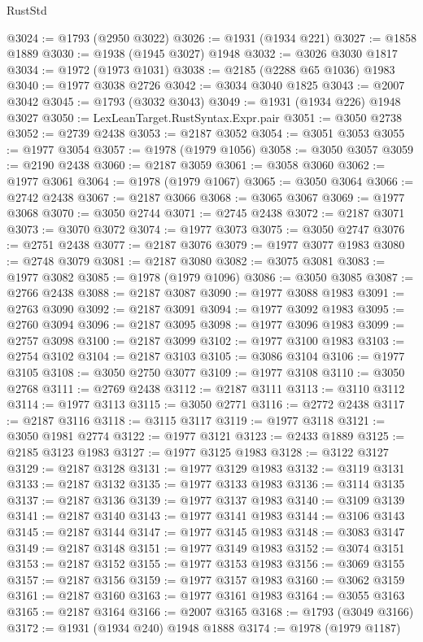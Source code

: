 \begin{lexlean}{RustStd}
\begin{coremodule}
@3024 := @1793 (@2950 @3022)
@3026 := @1931 (@1934 @221)
@3027 := @1858 @1889
@3030 := @1938 (@1945 @3027) @1948
@3032 := @3026 @3030 @1817
@3034 := @1972 (@1973 @1031)
@3038 := @2185 (@2288 @65 @1036) @1983
@3040 := @1977 @3038 @2726
@3042 := @3034 @3040 @1825
@3043 := @2007 @3042
@3045 := @1793 (@3032 @3043)
@3049 := @1931 (@1934 @226) @1948 @3027
@3050 := LexLeanTarget.RustSyntax.Expr.pair
@3051 := @3050 @2738
@3052 := @2739 @2438
@3053 := @2187 @3052
@3054 := @3051 @3053
@3055 := @1977 @3054
@3057 := @1978 (@1979 @1056)
@3058 := @3050 @3057
@3059 := @2190 @2438
@3060 := @2187 @3059
@3061 := @3058 @3060
@3062 := @1977 @3061
@3064 := @1978 (@1979 @1067)
@3065 := @3050 @3064
@3066 := @2742 @2438
@3067 := @2187 @3066
@3068 := @3065 @3067
@3069 := @1977 @3068
@3070 := @3050 @2744
@3071 := @2745 @2438
@3072 := @2187 @3071
@3073 := @3070 @3072
@3074 := @1977 @3073
@3075 := @3050 @2747
@3076 := @2751 @2438
@3077 := @2187 @3076
@3079 := @1977 @3077 @1983
@3080 := @2748 @3079
@3081 := @2187 @3080
@3082 := @3075 @3081
@3083 := @1977 @3082
@3085 := @1978 (@1979 @1096)
@3086 := @3050 @3085
@3087 := @2766 @2438
@3088 := @2187 @3087
@3090 := @1977 @3088 @1983
@3091 := @2763 @3090
@3092 := @2187 @3091
@3094 := @1977 @3092 @1983
@3095 := @2760 @3094
@3096 := @2187 @3095
@3098 := @1977 @3096 @1983
@3099 := @2757 @3098
@3100 := @2187 @3099
@3102 := @1977 @3100 @1983
@3103 := @2754 @3102
@3104 := @2187 @3103
@3105 := @3086 @3104
@3106 := @1977 @3105
@3108 := @3050 @2750 @3077
@3109 := @1977 @3108
@3110 := @3050 @2768
@3111 := @2769 @2438
@3112 := @2187 @3111
@3113 := @3110 @3112
@3114 := @1977 @3113
@3115 := @3050 @2771
@3116 := @2772 @2438
@3117 := @2187 @3116
@3118 := @3115 @3117
@3119 := @1977 @3118
@3121 := @3050 @1981 @2774
@3122 := @1977 @3121
@3123 := @2433 @1889
@3125 := @2185 @3123 @1983
@3127 := @1977 @3125 @1983
@3128 := @3122 @3127
@3129 := @2187 @3128
@3131 := @1977 @3129 @1983
@3132 := @3119 @3131
@3133 := @2187 @3132
@3135 := @1977 @3133 @1983
@3136 := @3114 @3135
@3137 := @2187 @3136
@3139 := @1977 @3137 @1983
@3140 := @3109 @3139
@3141 := @2187 @3140
@3143 := @1977 @3141 @1983
@3144 := @3106 @3143
@3145 := @2187 @3144
@3147 := @1977 @3145 @1983
@3148 := @3083 @3147
@3149 := @2187 @3148
@3151 := @1977 @3149 @1983
@3152 := @3074 @3151
@3153 := @2187 @3152
@3155 := @1977 @3153 @1983
@3156 := @3069 @3155
@3157 := @2187 @3156
@3159 := @1977 @3157 @1983
@3160 := @3062 @3159
@3161 := @2187 @3160
@3163 := @1977 @3161 @1983
@3164 := @3055 @3163
@3165 := @2187 @3164
@3166 := @2007 @3165
@3168 := @1793 (@3049 @3166)
@3172 := @1931 (@1934 @240) @1948 @1888
@3174 := @1978 (@1979 @1187)

\end{coremodule}
\end{lexlean}
